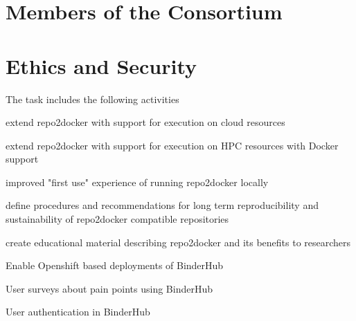 \documentclass[
  deliverables,
  longtasklabels,
  noworkareas,
  svgnames,
  \classoptions
]{euproposal}       %
\begin{document}
\begin{proposal}

\newpage


\section{Members of the Consortium}



\newpage

\section{Ethics and Security}

\end{proposal}

\begin{draft}
  

  The task includes the following activities
  \begin{compactitem}
  \item extend repo2docker with support for execution on cloud resources
  \item extend repo2docker with support for execution on HPC resources with Docker support
  \item improved "first use" experience of running repo2docker locally
  \item define procedures and recommendations for long term reproducibility and sustainability of repo2docker compatible repositories
  \item create educational material describing repo2docker and its benefits to researchers
  \item Enable Openshift based deployments of BinderHub
  \item User surveys about pain points using BinderHub
  \item User authentication in BinderHub
  \end{compactitem}
  \end{draft}
\end{document}
